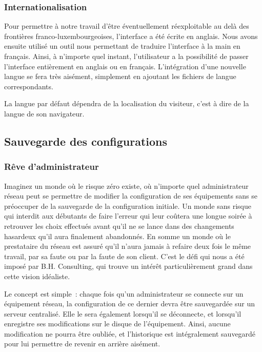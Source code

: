 \subsubsection{Internationalisation}

Pour permettre à notre travail d'être éventuellement réexploitable au delà des frontières franco-luxembourgeoises, l'interface a été écrite en anglais. Nous avons ensuite utilisé un outil nous permettant de traduire l'interface à la main en français. Ainsi, à n'importe quel instant, l'utilisateur a la possibilité de passer l'interface entièrement en anglais ou en français. L'intégration d'une nouvelle langue se fera très aisément, simplement en ajoutant les fichiers de langue correspondants.

La langue par défaut dépendra de la localisation du visiteur, c'est à dire de la langue de son navigateur.

\subsection{Sauvegarde des configurations}
\label{chap-sauvegardes}
\subsubsection{Rêve d'administrateur}

Imaginez un monde où le risque zéro existe, où n'importe quel administrateur réseau peut se permettre de modifier la configuration de ses équipements sans se préoccuper de la sauvegarde de la configuration initiale. Un monde sans risque qui interdit aux débutants de faire l'erreur qui leur coûtera une longue soirée à retrouver les choix effectués avant qu'il ne se lance dans des changements hasardeux qu'il aura finalement abandonnés. En somme un monde où le prestataire du réseau est assuré qu'il n'aura jamais à refaire deux fois le même travail, par sa faute ou par la faute de son client. C'est le défi qui nous a été imposé par B.H. Consulting, qui trouve un intérêt particulièrement grand dans cette vision idéaliste.

Le concept est simple~: chaque fois qu'un administrateur se connecte sur un équipement réseau, la configuration de ce dernier devra être sauvegardée sur un serveur centralisé. Elle le sera également lorsqu'il se déconnecte, et lorsqu'il enregistre ses modifications sur le disque de l'équipement. Ainsi, aucune modification ne pourra être oubliée, et l'historique est intégralement sauvegardé pour lui permettre de revenir en arrière aisément.

